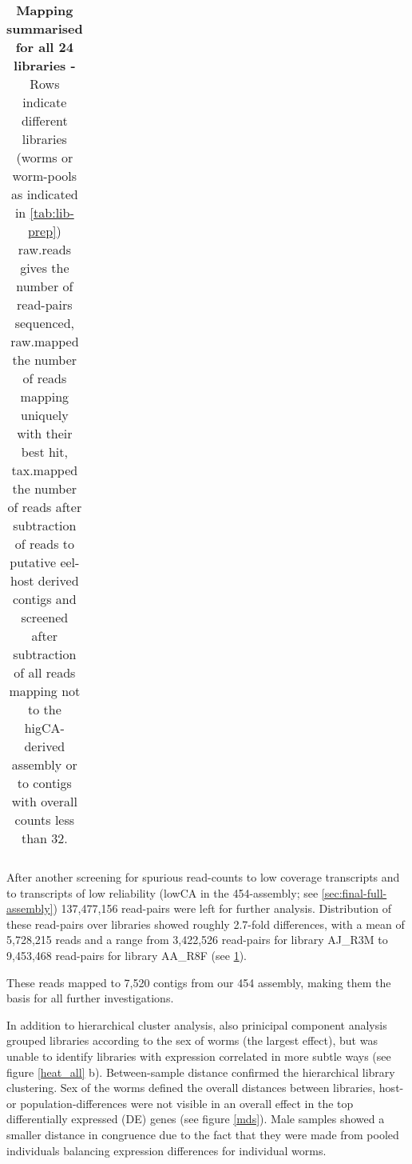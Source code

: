 \begin{table}[h]
\begin{center}
\begin{tabular}{llrrr}
   \hline
\end{tabular}
\caption[mapping Summary]{\textbf{Mapping summarised for all 24
    libraries -} Rows indicate different libraries (worms or
  worm-pools as indicated in \ref{tab:lib-prep}) raw.reads gives the
  number of read-pairs sequenced, raw.mapped the number of reads
  mapping uniquely with their best hit, tax.mapped the number of reads
  after subtraction of reads to putative eel-host derived contigs
  and screened after subtraction of all reads mapping not to the
  higCA-derived assembly or to contigs with overall counts less than
  32.}
\label{tab:read-clean}
\end{center}
\end{table}


After another screening for spurious read-counts to low coverage
transcripts and to transcripts of low reliability (lowCA in the
454-assembly; see \ref{sec:final-full-assembly}) 137,477,156
read-pairs were left for further analysis. Distribution of these
read-pairs over libraries showed roughly 2.7-fold differences, with a
mean of 5,728,215 reads and a range from 3,422,526 read-pairs for
library AJ\_R3M to 9,453,468 read-pairs for library AA\_R8F (see
\ref{tab:read-clean}).


\afterpage{\clearpage}

These reads mapped to 7,520 contigs from our 454 assembly, making them
the basis for all further investigations.

In addition to hierarchical cluster analysis, also prinicipal
component analysis grouped libraries according to the sex of worms
(the largest effect), but was unable to identify libraries with
expression correlated in more subtle ways (see figure \ref{heat_all}
b). Between-sample distance confirmed the hierarchical library
clustering. Sex of the worms defined the overall distances between
libraries, host- or population-differences were not visible in an
overall effect in the top differentially expressed (DE) genes (see
figure \ref{mds}). Male samples showed a smaller distance in
congruence due to the fact that they were made from pooled individuals
balancing expression differences for individual worms.


